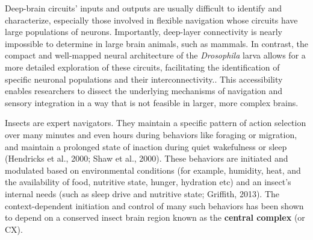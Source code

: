     Deep-brain circuits' inputs and outputs are usually difficult to identify and characterize, especially those involved in flexible navigation whose circuits have large populations of neurons. Importantly, deep-layer connectivity is nearly impossible to determine in large brain animals, such as mammals. In contrast, the compact and well-mapped neural architecture of the \textit{Drosophila} larva allows for a more detailed exploration of these circuits, facilitating the identification of specific neuronal populations and their interconnectivity.. This accessibility enables researchers to dissect the underlying mechanisms of navigation and sensory integration in a way that is not feasible in larger, more complex brains.

    Insects are expert navigators. They maintain a specific pattern of action selection over many minutes and even hours during behaviors like foraging or migration, and maintain a prolonged state of inaction during quiet wakefulness or sleep (Hendricks et al., 2000; Shaw et al., 2000). These behaviors are initiated and modulated based on environmental conditions (for example, humidity, heat, and the availability of food, nutritive state, hunger, hydration etc) and an insect’s internal needs (such as sleep drive and nutritive state; Griffith, 2013). The context-dependent initiation and control of many such behaviors has been shown to depend on a conserved insect brain region known as the \textbf{central complex} (or CX). %


